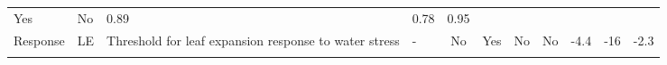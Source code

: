 \documentclass[a4paper]{article}
\begin{document}
\begin{longtable}[]{@{}llllccccrrr@{}}
\begin{minipage}[t]{0.05\columnwidth}
Yes\strut
\end{minipage} & \begin{minipage}[t]{0.04\columnwidth}\centering\strut
No\strut
\end{minipage} & \begin{minipage}[t]{0.04\columnwidth}\raggedleft\strut
0.89\strut
\end{minipage} & \begin{minipage}[t]{0.04\columnwidth}\raggedleft\strut
0.78\strut
\end{minipage} & \begin{minipage}[t]{0.04\columnwidth}\raggedleft\strut
0.95\strut
\end{minipage}\tabularnewline
\begin{minipage}[t]{0.08\columnwidth}\raggedright\strut
Response\strut
\end{minipage} & \begin{minipage}[t]{0.05\columnwidth}\raggedright\strut
LE\strut
\end{minipage} & \begin{minipage}[t]{0.19\columnwidth}\raggedright\strut
Threshold for leaf expansion response to water stress\strut
\end{minipage} & \begin{minipage}[t]{0.06\columnwidth}\raggedright\strut
-\strut
\end{minipage} & \begin{minipage}[t]{0.06\columnwidth}\centering\strut
No\strut
\end{minipage} & \begin{minipage}[t]{0.08\columnwidth}\centering\strut
Yes\strut
\end{minipage} & \begin{minipage}[t]{0.05\columnwidth}\centering\strut
No\strut
\end{minipage} & \begin{minipage}[t]{0.04\columnwidth}\centering\strut
No\strut
\end{minipage} & \begin{minipage}[t]{0.04\columnwidth}\raggedleft\strut
-4.4\strut
\end{minipage} & \begin{minipage}[t]{0.04\columnwidth}\raggedleft\strut
-16\strut
\end{minipage} & \begin{minipage}[t]{0.04\columnwidth}\raggedleft\strut
-2.3\strut
\end{minipage}\tabularnewline
\begin{minipage}[t]{0.08\columnwidth}\raggedright\strut

\end{minipage}
\end{longtable}
\end{document}
